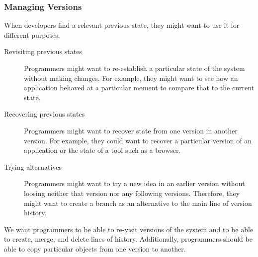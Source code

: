 \subsubsection{Managing Versions}

When developers find a relevant previous state, they might want to use it for different purposes:

\begin{description}
    \item[Revisiting previous states] Programmers might want to re-establish a particular state of the system without making changes. For example, they might want to see how an application behaved at a particular moment to compare that to the current state.
    \item[Recovering previous states] Programmers might want to recover state from one version in another version. For example, they could want to recover a particular version of an application or the state of a tool such as a browser.
    \item[Trying alternatives] Programmers might want to try a new idea in an earlier version without loosing neither that version nor any following versions. Therefore, they might want to create a branch as an alternative to the main line of version history.
\end{description}

We want programmers to be able to re-visit versions of the system and to be able to create, merge, and delete lines of history.
Additionally, programmers should be able to copy particular objects from one version to another.

